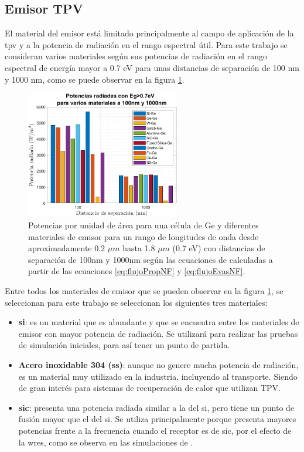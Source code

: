 \subsection{Emisor TPV}
El material del emisor está limitado principalmente al campo de aplicación de la \acrshort{tpv} y a la potencia de radiación en el rango espectral útil. Para este trabajo se consideran varios materiales según sus potencias de radiación en el rango espectral de energía mayor a 0.7 eV para unas distancias de separación de 100 nm y 1000 nm, como se puede observar en la figura \ref{fig:EgRad}.
\begin{figure}[H]
	\centering
		\includegraphics[width=0.6\textwidth]{figuras/rad_mat/EgRad.png}
	\caption[Potencias por unidad de área para una célula de Ge y diferentes materiales de emisor para un rango de longitudes de onda desde aproximadamente 0.2 $\mu m$ hasta 1.8 $\mu m$ (0.7 eV) con distancias de separación de 100nm y 1000nm según las ecuaciones \eqref{eq:flujoPropNF} y \eqref{eq:flujoEvasNF}]{Potencias por unidad de área para una célula de Ge y diferentes materiales de emisor para un rango de longitudes de onda desde aproximadamente 0.2 $\mu m$ hasta 1.8 $\mu m$ (0.7 eV) con distancias de separación de 100nm y 1000nm según las ecuaciones de \cite{nfTPV_equations} calculadas a partir de las ecuaciones \eqref{eq:flujoPropNF} y \eqref{eq:flujoEvasNF}.}
	\label{fig:EgRad}
\end{figure}
Entre todos los materiales de emisor que se pueden observar en la figura \ref{fig:EgRad}, se seleccionan para este trabajo se seleccionan los siguientes tres materiales:
\begin{itemize}
	\item \textbf{\gls{si}}: es un material que es abundante y que se encuentra entre los materiales de emisor con mayor potencia de radiación. Se utilizará para realizar las pruebas de simulación iniciales, para así tener un punto de partida.
	\item \textbf{Acero inoxidable 304 (\acrshort{ss})}: aunque no genere mucha potencia de radiación, es un material muy utilizado en la industria, incluyendo al transporte. Siendo de gran interés para sistemas de recuperación de calor que utilizan TPV.
	\item \textbf{\gls{sic}}: presenta una potencia radiada similar a la del \gls{si}, pero tiene un punto de fusión mayor que el del \gls{si}. Se utiliza principalmente porque presenta mayores potencias frente a la frecuencia cuando el receptor es de \gls{sic}, por el efecto de la \gls{wres}, como se observa en las simulaciones de \cite{doi:Near_field_ThinFilm}.
\end{itemize}

